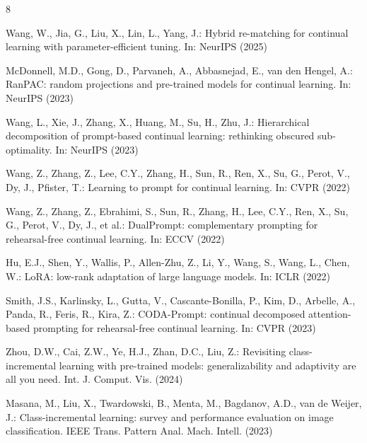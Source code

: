 \documentclass[runningheads]{llncs}
\begin{document}
\begin{thebibliography}{8}

Wang, W., Jia, G., Liu, X., Lin, L., Yang, J.: Hybrid re-matching for continual
learning with parameter-efficient tuning. In: NeurIPS (2025)

McDonnell, M.D., Gong, D., Parvaneh, A., Abbasnejad, E., van den Hengel, A.:
RanPAC: random projections and pre-trained models for continual learning. In:
NeurIPS (2023)

Wang, L., Xie, J., Zhang, X., Huang, M., Su, H., Zhu, J.: Hierarchical
decomposition of prompt-based continual learning: rethinking obscured
sub-optimality. In: NeurIPS (2023)

Wang, Z., Zhang, Z., Lee, C.Y., Zhang, H., Sun, R., Ren, X., Su, G., Perot, V.,
Dy, J., Pfister, T.: Learning to prompt for continual learning. In: CVPR (2022)

Wang, Z., Zhang, Z., Ebrahimi, S., Sun, R., Zhang, H., Lee, C.Y., Ren, X., Su,
G., Perot, V., Dy, J., et al.: DualPrompt: complementary prompting for
rehearsal-free continual learning. In: ECCV (2022)

Hu, E.J., Shen, Y., Wallis, P., Allen-Zhu, Z., Li, Y., Wang, S., Wang, L., Chen,
W.: LoRA: low-rank adaptation of large language models. In: ICLR (2022)


Smith, J.S., Karlinsky, L., Gutta, V., Cascante-Bonilla, P., Kim, D., Arbelle,
A., Panda, R., Feris, R., Kira, Z.: CODA-Prompt: continual decomposed
attention-based prompting for rehearsal-free continual learning. In: CVPR (2023)

Zhou, D.W., Cai, Z.W., Ye, H.J., Zhan, D.C., Liu, Z.: Revisiting
class-incremental learning with pre-trained models: generalizability and
adaptivity are all you need. Int. J. Comput. Vis. (2024)

Masana, M., Liu, X., Twardowski, B., Menta, M., Bagdanov, A.D., van de Weijer,
J.: Class-incremental learning: survey and performance evaluation on image
classification. IEEE Trans. Pattern Anal. Mach. Intell. (2023)


\end{thebibliography}
\end{document}
